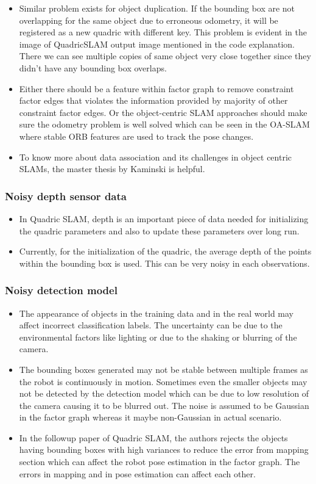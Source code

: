 \documentclass{article}
\begin{document}
\begin{itemize}
\item Similar problem exists for object duplication. If the bounding box are not overlapping for the same object due to erroneous odometry, it will be registered as a new quadric with different key. This problem is evident in the image of QuadricSLAM output image mentioned in the code explanation. There we can see multiple copies of same object very close together since they didn't have any bounding box overlaps.
\item Either there should be a feature within factor graph to remove constraint factor edges that violates the information provided by majority of other constraint factor edges. Or the object-centric SLAM approaches should make sure the odometry problem is well solved which can be seen in the OA-SLAM where stable ORB features are used to track the pose changes.
\item To know more about data association and its challenges in object centric SLAMs, the master thesis by Kaminski\cite{dataassosciation} is helpful.
\end{itemize}
\subsubsection{Noisy depth sensor data}
\begin{itemize}
\item In Quadric SLAM, depth is an important piece of data needed for initializing the quadric parameters and also to update these parameters over long run.
\item Currently, for the initialization of the quadric, the average depth of the points within the bounding box is used. This can be very noisy in each observations.
\end{itemize}
\subsubsection{Noisy detection model}
\begin{itemize}
\item The appearance of objects in the training data and in the real world may affect incorrect classification labels. The uncertainty can be due to the environmental factors like lighting or due to the shaking or blurring of the camera.
\item The bounding boxes generated may not be stable between multiple frames as the robot is continuously in motion. Sometimes even the smaller objects may not be detected by the detection model which can be due to low resolution of the camera causing it to be blurred out. The noise is assumed to be Gaussian in the factor graph whereas it maybe non-Gaussian in actual scenario.
\item In the followup paper of Quadric SLAM\cite{orientation_factor}, the authors rejects the objects having bounding boxes with high variances to reduce the error from mapping section which can affect the robot pose estimation in the factor graph. The errors in mapping and in pose estimation can affect each other.
\end{itemize}
\end{document}

